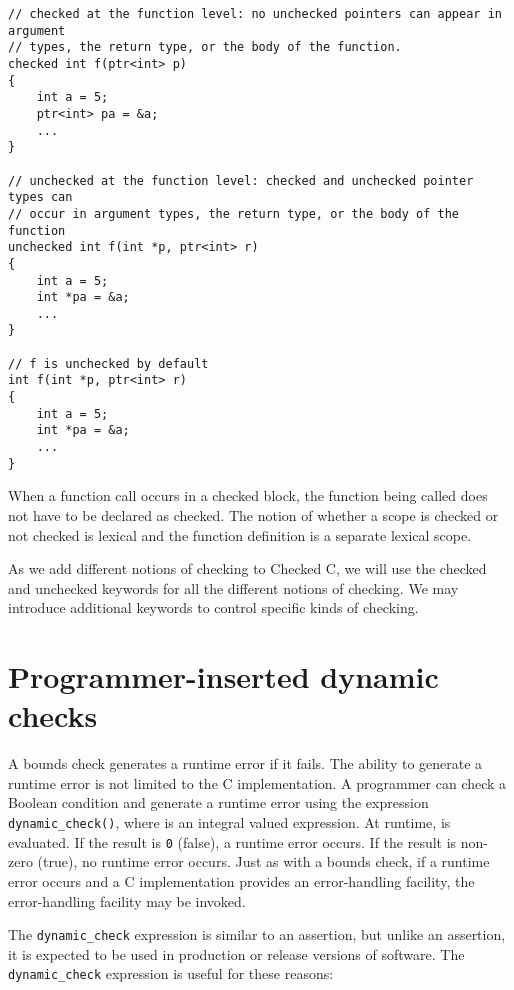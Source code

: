 \begin{verbatim}
// checked at the function level: no unchecked pointers can appear in argument
// types, the return type, or the body of the function.
checked int f(ptr<int> p) 
{
    int a = 5;
    ptr<int> pa = &a;
    ...
}

// unchecked at the function level: checked and unchecked pointer types can
// occur in argument types, the return type, or the body of the function
unchecked int f(int *p, ptr<int> r)
{
    int a = 5;
    int *pa = &a;
    ...
}

// f is unchecked by default
int f(int *p, ptr<int> r)
{
    int a = 5;
    int *pa = &a;
    ...
}
\end{verbatim}

When a function call occurs in a checked block, the function being
called does not have to be declared as checked. The notion of whether a
scope is checked or not checked is lexical and the function definition
is a separate lexical scope.

As we add different notions of checking to Checked C, we will use the
checked and unchecked keywords for all the different notions of
checking. We may introduce additional keywords to control specific kinds
of checking.

\section{Programmer-inserted dynamic checks}
\label{section:programmer-dynamic-checks}

A bounds check generates a runtime error if it fails. The ability to
generate a runtime error is not limited to the C implementation. A
programmer can check a Boolean condition and generate a runtime error
using the expression \texttt{dynamic\_check(}\texttt{)}, where
 is an integral valued expression. At runtime,  is
evaluated. If the result is \texttt{0} (false), a runtime error occurs.
If the result is non-zero (true), no runtime error occurs. Just as with
a bounds check, if a runtime error occurs and a C implementation
provides an error-handling facility, the error-handling facility may be
invoked.

The \texttt{dynamic\_check} expression is similar to an assertion, but
unlike an assertion, it is expected to be used in production or release
versions of software. The \texttt{dynamic\_check} expression is useful
for these reasons:

